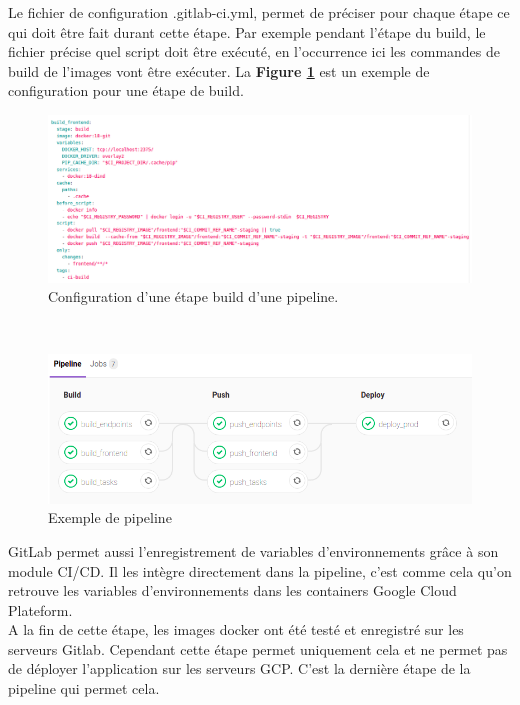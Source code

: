 \documentclass{article} %
\begin{document}
Le fichier de configuration .gitlab-ci.yml, permet de préciser pour chaque étape ce qui doit être fait durant cette étape. Par exemple pendant l'étape du build, le fichier précise quel script doit être exécuté, en l'occurrence ici les commandes de build de l'images vont être exécuter. La \textbf{Figure \ref{fig:gitlab-ci}} est un exemple de configuration pour une étape de build.

\begin{figure}[!h]
	\centering
	\includegraphics[keepaspectratio = true,scale=0.4]{gitlab.png}
	\caption{Configuration d'une étape build d'une pipeline.}
	\label{fig:gitlab-ci}
\end{figure}
~\\
\begin{figure}[!h]
	\centering
	\includegraphics[keepaspectratio = true,scale=0.4]{pipeline.png}
	\caption{Exemple de pipeline}
	\label{fig:pipeline}
\end{figure}

GitLab permet aussi l'enregistrement de variables d'environnements grâce à son module CI/CD. Il les intègre directement dans la pipeline, c'est comme cela qu'on retrouve les variables d'environnements dans les containers Google Cloud Plateform.\\

A la fin de cette étape, les images docker ont été testé et enregistré sur les serveurs Gitlab. Cependant cette étape permet uniquement cela et ne permet pas de déployer l'application sur les serveurs GCP. C'est la dernière étape de la pipeline qui permet cela.
\end{document}
